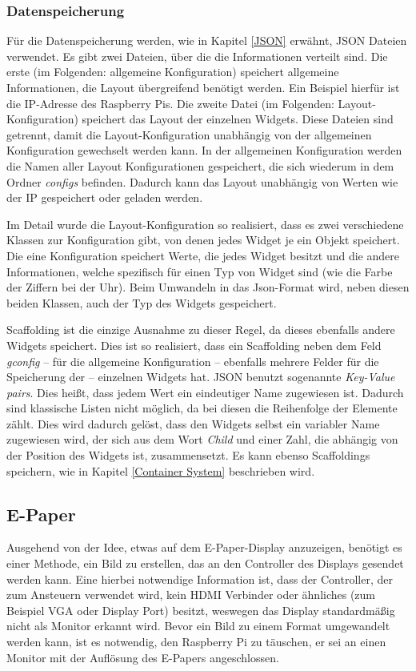 \documentclass[10pt]{article}
\begin{document}
\subsubsection{Datenspeicherung}
Für die Datenspeicherung werden, wie in Kapitel \ref{JSON} erwähnt, JSON Dateien verwendet. Es gibt zwei Dateien, über die die Informationen verteilt sind. Die erste (im Folgenden: allgemeine Konfiguration) speichert allgemeine Informationen, die Layout übergreifend benötigt werden. Ein Beispiel hierfür ist die IP-Adresse des Raspberry Pis. Die zweite Datei (im Folgenden: Layout-Konfiguration) speichert das Layout der einzelnen Widgets. Diese Dateien sind getrennt, damit  die Layout-Konfiguration unabhängig von der allgemeinen Konfiguration gewechselt werden kann. In der allgemeinen Konfiguration werden die Namen aller Layout Konfigurationen gespeichert, die sich wiederum in dem Ordner \textit{configs} befinden. Dadurch kann das Layout unabhängig von Werten wie der IP gespeichert oder geladen werden.

Im Detail wurde die Layout-Konfiguration so realisiert, dass es zwei verschiedene Klassen zur Konfiguration gibt, von denen jedes Widget je ein Objekt speichert. Die eine Konfiguration speichert Werte, die jedes Widget besitzt und die andere Informationen, welche spezifisch für einen Typ von Widget sind (wie die Farbe der Ziffern bei der Uhr). Beim Umwandeln in das Json-Format wird, neben diesen beiden Klassen, auch der Typ des Widgets gespeichert.

Scaffolding ist die einzige Ausnahme zu dieser Regel, da dieses ebenfalls andere Widgets speichert. Dies ist so realisiert, dass ein Scaffolding neben dem Feld \textit{gconfig} – für die allgemeine Konfiguration – ebenfalls mehrere Felder für die Speicherung der  – einzelnen Widgets hat. JSON benutzt sogenannte \textit{Key-Value pairs}. Dies heißt, dass jedem Wert ein eindeutiger Name zugewiesen ist. Dadurch sind klassische Listen nicht möglich, da bei diesen die Reihenfolge der Elemente zählt. Dies wird dadurch gelöst, dass den Widgets selbst ein variabler Name zugewiesen wird, der sich aus dem Wort \textit{Child} und einer Zahl, die abhängig von der Position des Widgets ist, zusammensetzt. Es kann ebenso Scaffoldings speichern, wie in Kapitel \ref{Container System} beschrieben wird.

\subsection{E-Paper}\label{Bildgenerierung}
Ausgehend von der Idee, etwas auf dem E-Paper-Display anzuzeigen, benötigt es einer Methode, ein Bild zu erstellen, das an den Controller des Displays gesendet werden kann. Eine hierbei notwendige Information ist, dass der Controller, der zum Ansteuern verwendet wird, kein HDMI Verbinder oder ähnliches (zum Beispiel VGA oder Display Port) besitzt, weswegen das Display standardmäßig nicht als Monitor erkannt wird. Bevor ein Bild zu einem Format umgewandelt werden kann, ist es notwendig, den Raspberry Pi zu täuschen, er sei an einen Monitor mit der Auflösung des E-Papers angeschlossen. 
\end{document}
